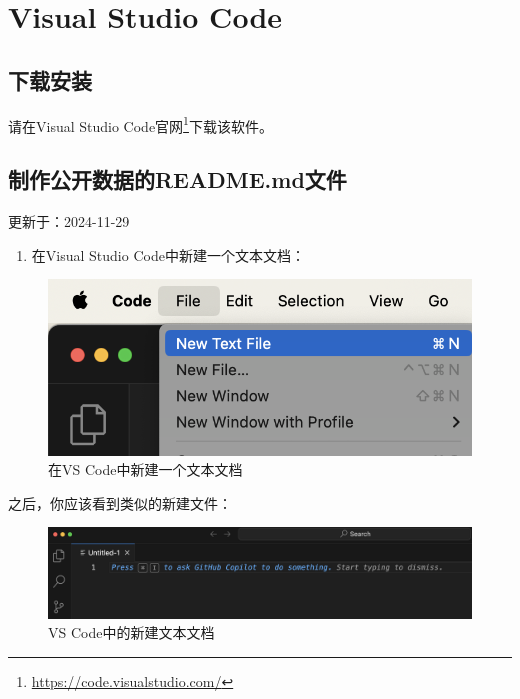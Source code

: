 \documentclass[]{ctexbook}
\providecommand{\tightlist}{%
  \setlength{\itemsep}{0pt}\setlength{\parskip}{0pt}}
\renewcommand{\href}[2]{#2\footnote{\url{#1}}}
\theoremstyle{definition}
\theoremstyle{definition}
\theoremstyle{definition}
\theoremstyle{definition}
\theoremstyle{remark}
\begin{document}
\chapter{Visual Studio Code}\label{vscode}

\section{下载安装}\label{ux4e0bux8f7dux5b89ux88c5-1}

请在\href{https://code.visualstudio.com/}{Visual Studio Code官网}下载该软件。

\section{制作公开数据的README.md文件}\label{mkreadme}

更新于：2024-11-29

\begin{enumerate}
\def\labelenumi{\arabic{enumi}.}
\tightlist
\item
  在Visual Studio Code中新建一个文本文档：
\end{enumerate}

\begin{figure}

{\centering \includegraphics[width=0.6\linewidth]{img/vscode/mkreadme_mknewfile} 

}

\caption{在VS Code中新建一个文本文档}\label{fig:mkreadme-mknewfile}
\end{figure}

之后，你应该看到类似的新建文件：

\begin{figure}

{\centering \includegraphics[width=1\linewidth]{img/vscode/mkreadme_newfile} 

}

\caption{VS Code中的新建文本文档}\label{fig:mkreadme-newfile}
\end{figure}
\end{document}
